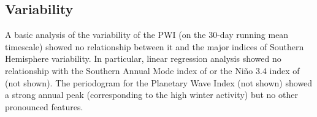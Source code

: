 \subsection{Variability}

A basic analysis of the variability of the PWI (on the 30-day running mean timescale) showed no relationship between it and the major indices of Southern Hemisphere variability. In particular, linear regression analysis showed no relationship with the Southern Annual Mode index of \citet{Marshall2003} or the Ni\~{n}o 3.4 index of \citet{Trenberth2001} (not shown). The periodogram for the Planetary Wave Index (not shown) showed a strong annual peak (corresponding to the high winter activity) but no other pronounced features.